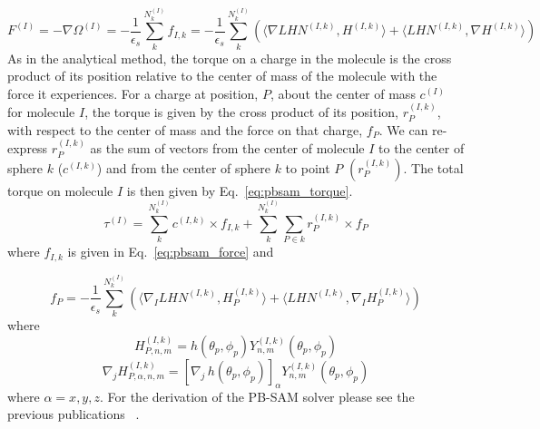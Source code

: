 \documentclass[12pt,titlepage]{article}
\begin{document}
\begin{equation}
F^{(I)} = - \nabla \Omega^{(I)} =  -  \frac{1}{\epsilon_s} \sum_{k}^{N_k^{(I)}} f_{I,k} = -  \frac{1}{\epsilon_s} \sum_{k}^{N_k^{(I)}}( \langle \nabla LHN^{(I,k)}, H^{(I,k)} \rangle +  \langle LHN^{(I,k)}, \nabla H^{(I,k)} \rangle)
\label{eq:pbsam_force}
\end{equation}
%
As in the analytical method, the torque on a charge in the molecule is the cross product of its position relative to the center of mass of the molecule with the force it experiences. For a charge at position, \(P\), about the center of mass \(c^{(I)}\) for molecule \(I\), the torque is given by the cross product of its position, \(r_P^{(I,k)}\), with respect to the center of mass and the force on that charge, $f_P$. We can re-express \(r_P^{(I,k)}\) as the sum of vectors from the center of molecule $I$ to the center of sphere \(k\) (\(c^{(I,k)}\)) and from the center of sphere \(k\) to point $P$ \((r_P^{(I,k)})\). The total torque on molecule \(I\) is then given by Eq.~\ref{eq:pbsam_torque}.
%
\begin{equation}
\tau^{(I)} =  \sum_{k}^{N_k^{(I)}} c^{(I,k)} \times   f_{I,k} + \sum_{k}^{N_k^{(I)}}  \sum_{P\in k} r_P^{(I,k)} \times f_P 
\label{eq:pbsam_torque}
\end{equation}
%
where \(f_{I,k}\) is given in Eq.~\ref{eq:pbsam_force} and

\begin{equation}
f_P = -  \frac{1}{\epsilon_s} \sum_{k}^{N_k^{(I)}}( \langle \nabla_I LHN^{(I,k)}, H_P^{(I,k)} \rangle +  \langle LHN^{(I,k)}, \nabla_I H_P^{(I,k)} \rangle)
\label{eq:pbsam_torque_fp}
\end{equation}
%
where
\begin{equation}
H_{P,n,m}^{(I,k)} =h(\theta_p, \phi_p) Y_{n,m}^{(I,k)} (\theta_p, \phi_p) 
\label{eq:pbsam_hp}
\end{equation}
%
\begin{equation}
\nabla_j H_{P,\alpha, n,m}^{(I,k)} = \left [ \nabla_j \, h(\theta_p, \phi_p) \right ]_{\alpha}   Y_{n,m}^{(I,k)} (\theta_p, \phi_p) 
\label{eq:pbsam_derv_hp}
\end{equation}
%
where \(\alpha = x , y, z\). For the derivation of the PB-SAM solver please see the previous publications~\cite{Yap2010, Yap2013} .
\end{document}
